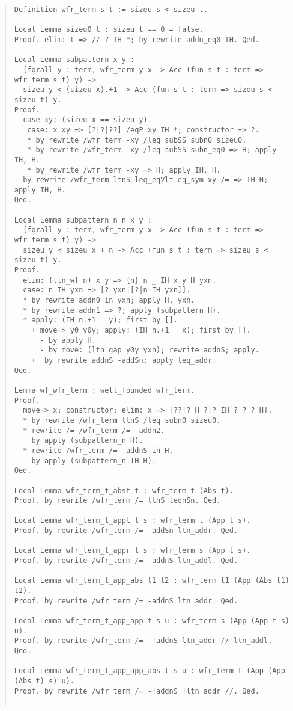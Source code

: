 \documentclass[12pt, titlepage]{ltjsarticle}
\begin{document}
\begin{quote}
\begin{verbatim}
Definition wfr_term s t := sizeu s < sizeu t.

Local Lemma sizeu0 t : sizeu t == 0 = false.
Proof. elim: t => // ? IH *; by rewrite addn_eq0 IH. Qed.

Local Lemma subpattern x y :
  (forall y : term, wfr_term y x -> Acc (fun s t : term => wfr_term s t) y) -> 
  sizeu y < (sizeu x).+1 -> Acc (fun s t : term => sizeu s < sizeu t) y.
Proof.
  case xy: (sizeu x == sizeu y).
   case: x xy => [?|?|??] /eqP xy IH *; constructor => ?.
   * by rewrite /wfr_term -xy /leq subSS subn0 sizeu0.
   * by rewrite /wfr_term -xy /leq subSS subn_eq0 => H; apply IH, H.
   * by rewrite /wfr_term -xy => H; apply IH, H.
  by rewrite /wfr_term ltnS leq_eqVlt eq_sym xy /= => IH H; apply IH, H.
Qed.

Local Lemma subpattern_n n x y :
  (forall y : term, wfr_term y x -> Acc (fun s t : term => wfr_term s t) y) -> 
  sizeu y < sizeu x + n -> Acc (fun s t : term => sizeu s < sizeu t) y.
Proof.
  elim: (ltn_wf n) x y => {n} n _ IH x y H yxn.
  case: n IH yxn => [? yxn|[?|n IH yxn]].
  * by rewrite addn0 in yxn; apply H, yxn.
  * by rewrite addn1 => ?; apply (subpattern H).
  * apply: (IH n.+1 _ y); first by [].
    + move=> y0 y0y; apply: (IH n.+1 _ x); first by [].
      - by apply H.
      - by move: (ltn_gap y0y yxn); rewrite addnS; apply.
    +  by rewrite addnS -addSn; apply leq_addr.
Qed.

Lemma wf_wfr_term : well_founded wfr_term.
Proof.
  move=> x; constructor; elim: x => [??|? H ?|? IH ? ? ? H].
  * by rewrite /wfr_term ltnS /leq subn0 sizeu0.
  * rewrite /= /wfr_term /= -addn2.
    by apply (subpattern_n H).
  * rewrite /wfr_term /= -addnS in H.
    by apply (subpattern_n IH H).
Qed.

Local Lemma wfr_term_t_abst t : wfr_term t (Abs t).
Proof. by rewrite /wfr_term /= ltnS leqnSn. Qed.

Local Lemma wfr_term_t_appl t s : wfr_term t (App t s).
Proof. by rewrite /wfr_term /= -addSn ltn_addr. Qed.

Local Lemma wfr_term_t_appr t s : wfr_term s (App t s).
Proof. by rewrite /wfr_term /= -addnS ltn_addl. Qed.

Local Lemma wfr_term_t_app_abs t1 t2 : wfr_term t1 (App (Abs t1) t2).
Proof. by rewrite /wfr_term /= -addnS ltn_addr. Qed.

Local Lemma wfr_term_t_app_app t s u : wfr_term s (App (App t s) u).
Proof. by rewrite /wfr_term /= -!addnS ltn_addr // ltn_addl. Qed.

Local Lemma wfr_term_t_app_app_abs t s u : wfr_term t (App (App (Abs t) s) u).
Proof. by rewrite /wfr_term /= -!addnS !ltn_addr //. Qed.


\end{verbatim}
\end{quote}
\end{document}
